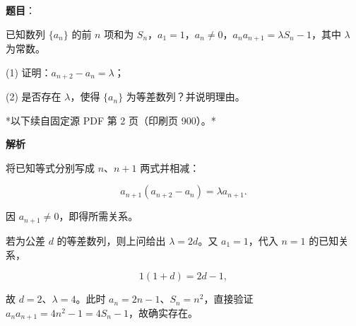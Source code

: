 \begin{answer}

\textbf{题目}：

已知数列 $\{a_n\}$ 的前 $n$ 项和为 $S_n$，$a_1=1$，$a_n\ne0$，$a_na_{n+1}=\lambda S_n-1$，其中 $\lambda$ 为常数。

(1) 证明：$a_{n+2}-a_n=\lambda$；

(2) 是否存在 $\lambda$，使得 $\{a_n\}$ 为等差数列？并说明理由。

\par\medskip

*以下续自固定源 PDF 第 2 页（印刷页 900）。*

\textbf{解析}


将已知等式分别写成 $n$、$n+1$ 两式并相减：

\nopagebreak[4]
\[
a_{n+1}(a_{n+2}-a_n)=\lambda a_{n+1}.
\]

因 $a_{n+1}\ne0$，即得所需关系。


若为公差 $d$ 的等差数列，则上问给出 $\lambda=2d$。又 $a_1=1$，代入 $n=1$ 的已知关系，

\nopagebreak[4]
\[
1(1+d)=2d-1,
\]

故 $d=2$、$\lambda=4$。此时 $a_n=2n-1$、$S_n=n^2$，直接验证 $a_na_{n+1}=4n^2-1=4S_n-1$，故确实存在。



\end{answer}
